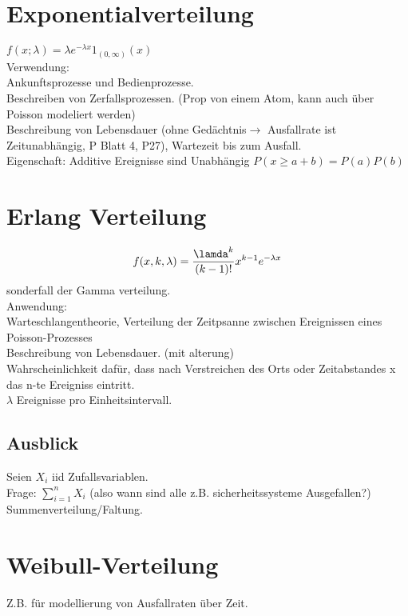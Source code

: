 \documentclass{article}
\begin{document}
	\section{Exponentialverteilung}
	$f(x;\lambda) = \lambda e^{-\lambda x}1_{(0,\infty)}(x) $\\
	Verwendung:\\
	Ankunftsprozesse und Bedienprozesse.\\
	Beschreiben von Zerfallsprozessen. (Prop von einem Atom, kann auch über Poisson modeliert werden)\\
	Beschreibung von Lebensdauer (ohne Gedächtnis$\to$ Ausfallrate ist Zeitunabhängig, P Blatt 4, P27), Wartezeit bis zum Ausfall.\\
	Eigenschaft: Additive Ereignisse sind Unabhängig $P(x\geq a+b) = P(a)P(b)$\\
	\section{Erlang Verteilung}
	\[f(x,k,\lambda) = \frac{\lamda^k}{(k-1)!} x^{k-1}e^{-\lambda x}\]
	sonderfall der Gamma verteilung.\\
	Anwendung:\\
	Warteschlangentheorie, Verteilung der Zeitpsanne zwischen Ereignissen eines Poisson-Prozesses\\
	Beschreibung von Lebensdauer. (mit alterung)\\
	Wahrscheinlichkeit dafür, dass nach Verstreichen des Orts oder Zeitabstandes x das n-te Ereigniss eintritt.\\
	$\lambda$ Ereignisse pro Einheitsintervall.\\
	\subsection{Ausblick}
	Seien $X_i$ iid Zufallsvariablen.\\
	Frage: $\sum^n_{i=1}X_i$ (also wann sind alle z.B. sicherheitssysteme Ausgefallen?)\\
	Summenverteilung/Faltung.\\
	\section{Weibull-Verteilung}
	Z.B. für modellierung von Ausfallraten über Zeit.\\
\end{document}
